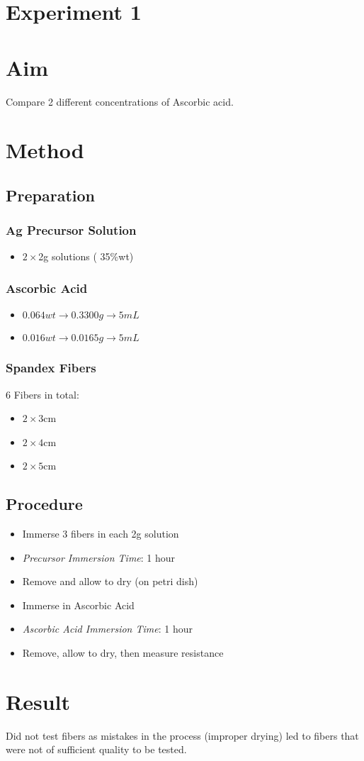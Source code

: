 \documentclass{article}
\begin{document}
\section*{Experiment 1}

\section{Aim}
Compare 2 different concentrations of Ascorbic acid. 

\section{Method}
\subsection{Preparation}
\subsubsection{Ag Precursor Solution}
\begin{itemize}
    \item $2 \times$2g solutions ( 35\%wt)
\end{itemize}

\subsubsection{Ascorbic Acid}
\begin{itemize}
    \item $0.064 wt \rightarrow 0.3300g \rightarrow  5mL$
    \item $0.016 wt \rightarrow 0.0165g \rightarrow  5mL$
\end{itemize}

\subsubsection{Spandex Fibers}
6 Fibers in total:
\begin{itemize}
    \item $2\times 3$cm
    \item $2\times 4$cm
    \item $2\times 5$cm
\end{itemize}

\subsection{Procedure}
\begin{itemize}
    \item Immerse 3 fibers in each 2g solution
    \item \textit{Precursor Immersion Time}: 1 hour
    \item Remove and allow to dry (on petri dish)
    \item Immerse in Ascorbic Acid
    \item \textit{Ascorbic Acid Immersion Time}: 1 hour
    \item Remove, allow to dry, then measure resistance
\end{itemize}



\section{Result}
Did not test fibers as mistakes in the process (improper drying) led to fibers that were not of sufficient quality to be tested.
\end{document}
